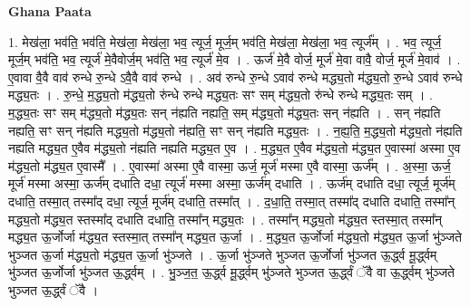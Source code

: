 \documentclass[17pt]{extarticle}
\begin{document}
\textbf{Ghana Paata } \newline

1. मेख॑ला॒ भव॑ति॒ भव॑ति॒ मेख॑ला॒ मेख॑ला॒ भव॒ त्यूर्ज॒ मूर्ज॒म् भव॑ति॒ मेख॑ला॒ मेख॑ला॒ भव॒ त्यूर्ज᳚म् । . भव॒ त्यूर्ज॒ मूर्ज॒म् भव॑ति॒ भव॒ त्यूर्ज॑ मे॒वैवोर्ज॒म् भव॑ति॒ भव॒ त्यूर्ज॑ मे॒व । . ऊर्ज॑ मे॒वै वोर्ज॒ मूर्ज॑ मे॒वा वावै॒ वोर्ज॒ मूर्ज॑ मे॒वाव॑ । . ए॒वावा वै॒वै वाव॑ रुन्धे रु॒न्धे ऽवै॒वै वाव॑ रुन्धे । . अव॑ रुन्धे रु॒न्धे ऽवाव॑ रुन्धे मद्ध्य॒तो म॑द्ध्य॒तो रु॒न्धे ऽवाव॑ रुन्धे मद्ध्य॒तः । . रु॒न्धे॒ म॒द्ध्य॒तो म॑द्ध्य॒तो रु॑न्धे रुन्धे मद्ध्य॒तः सꣳ सम् म॑द्ध्य॒तो रु॑न्धे रुन्धे मद्ध्य॒तः सम् । . म॒द्ध्य॒तः सꣳ सम् म॑द्ध्य॒तो म॑द्ध्य॒तः सन् न॑ह्यति नह्यति॒ सम् म॑द्ध्य॒तो म॑द्ध्य॒तः सन् न॑ह्यति । . सन् न॑ह्यति नह्यति॒ सꣳ सन् न॑ह्यति मद्ध्य॒तो म॑द्ध्य॒तो न॑ह्यति॒ सꣳ सन् न॑ह्यति मद्ध्य॒तः । . न॒ह्य॒ति॒ म॒द्ध्य॒तो म॑द्ध्य॒तो न॑ह्यति नह्यति मद्ध्य॒त ए॒वैव म॑द्ध्य॒तो न॑ह्यति नह्यति मद्ध्य॒त ए॒व । . म॒द्ध्य॒त ए॒वैव म॑द्ध्य॒तो म॑द्ध्य॒त ए॒वास्मा॑ अस्मा ए॒व म॑द्ध्य॒तो म॑द्ध्य॒त ए॒वास्मै᳚ । . ए॒वास्मा॑ अस्मा ए॒वै वास्मा॒ ऊर्ज॒ मूर्ज॑ मस्मा ए॒वै वास्मा॒ ऊर्ज᳚म् । . अ॒स्मा॒ ऊर्ज॒ मूर्ज॑ मस्मा अस्मा॒ ऊर्ज॑म् दधाति दधा॒ त्यूर्ज॑ मस्मा अस्मा॒ ऊर्ज॑म् दधाति । . ऊर्ज॑म् दधाति दधा॒ त्यूर्ज॒ मूर्ज॑म् दधाति॒ तस्मा॒त् तस्मा᳚द् दधा॒ त्यूर्ज॒ मूर्ज॑म् दधाति॒ तस्मा᳚त् । . द॒धा॒ति॒ तस्मा॒त् तस्मा᳚द् दधाति दधाति॒ तस्मा᳚न् मद्ध्य॒तो म॑द्ध्य॒त स्तस्मा᳚द् दधाति दधाति॒ तस्मा᳚न् मद्ध्य॒तः । . तस्मा᳚न् मद्ध्य॒तो म॑द्ध्य॒त स्तस्मा॒त् तस्मा᳚न् मद्ध्य॒त ऊ॒र्जोर्जा म॑द्ध्य॒त स्तस्मा॒त् तस्मा᳚न् मद्ध्य॒त ऊ॒र्जा । . म॒द्ध्य॒त ऊ॒र्जोर्जा म॑द्ध्य॒तो म॑द्ध्य॒त ऊ॒र्जा भु॑ञ्जते भुञ्जत ऊ॒र्जा म॑द्ध्य॒तो म॑द्ध्य॒त ऊ॒र्जा भु॑ञ्जते । . ऊ॒र्जा भु॑ञ्जते भुञ्जत ऊ॒र्जोर्जा भु॑ञ्जत ऊ॒र्द्ध्व मू॒र्द्ध्वम् भु॑ञ्जत ऊ॒र्जोर्जा भु॑ञ्जत ऊ॒र्द्ध्वम् । . भु॒ञ्ज॒त॒ ऊ॒र्द्ध्व मू॒र्द्ध्वम् भु॑ञ्जते भुञ्जत ऊ॒र्द्ध्वं ॅवै वा ऊ॒र्द्ध्वम् भु॑ञ्जते भुञ्जत ऊ॒र्द्ध्वं ॅवै । \newline
\end{document}
